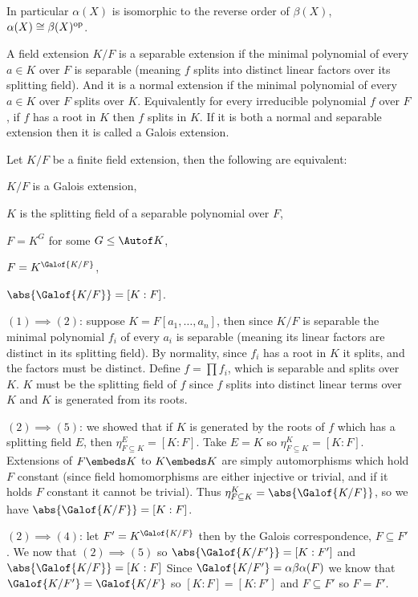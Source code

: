 In particular $\alpha(X)$ is isomorphic to the reverse order of $\beta(X)$, $\alpha(X)\cong\beta(X)^{\rm op}$.

\bdefn

    A field extension $K/F$ is a {\emphcolor separable extension} if the minimal polynomial of every $a\in K$ over $F$ is separable (meaning $f$ splits into distinct linear factors over its splitting field).
    And it is a {\emphcolor normal extension} if the minimal polynomial of every $a\in K$ over $F$ splits over $K$.
    Equivalently for every irreducible polynomial $f$ over $F$, if $f$ has a root in $K$ then $f$ splits in $K$.
    If it is both a normal and separable extension then it is called a {\emphcolor Galois extension}.

\edefn

\bthrm

    Let $K/F$ be a finite field extension, then the following are equivalent:
    \benum
        \item $K/F$ is a Galois extension,
        \item $K$ is the splitting field of a separable polynomial over $F$,
        \item $F=K^G$ for some $G\leq\Autof K$,
        \item $F=K^{\Galof{K/F}}$,
        \item $\abs{\Galof{K/F}}=[K:F]$.
    \eenum

\ethrm

\Proof $(1)\implies(2)$: suppose $K=F[a_1,\dots,a_n]$, then since $K/F$ is separable the minimal polynomial $f_i$ of every $a_i$ is separable (meaning its linear factors are distinct in its splitting field).
By normality, since $f_i$ has a root in $K$ it splits, and the factors must be distinct.
Define $f=\prod f_i$, which is separable and splits over $K$.
$K$ must be the splitting field of $f$ since $f$ splits into distinct linear terms over $K$ and $K$ is generated from its roots.

$(2)\implies(5)$: we showed that if $K$ is generated by the roots of $f$ which has a splitting field $E$, then $\eta_{F\subseteq K}^E=[K:F]$.
Take $E=K$ so $\eta_{F\subseteq K}^K=[K:F]$.
Extensions of $F\embeds K$ to $K\embeds K$ are simply automorphisms which hold $F$ constant (since field homomorphisms are either injective or trivial, and if it holds $F$ constant it cannot be trivial).
Thus $\eta_{F\subseteq K}^K=\abs{\Galof{K/F}}$, so we have $\abs{\Galof{K/F}}=[K:F]$.

$(2)\implies(4)$: let $F'=K^{\Galof{K/F}}$ then by the Galois correspondence, $F\subseteq F'$.
We now that $(2)\implies(5)$ so $\abs{\Galof{K/F'}}=[K:F']$ and $\abs{\Galof{K/F}}=[K:F]$
Since $\Galof{K/F'}=\alpha\beta\alpha(F)$ we know that $\Galof{K/F'}=\Galof{K/F}$ so $[K:F]=[K:F']$ and $F\subseteq F'$ so $F=F'$.

